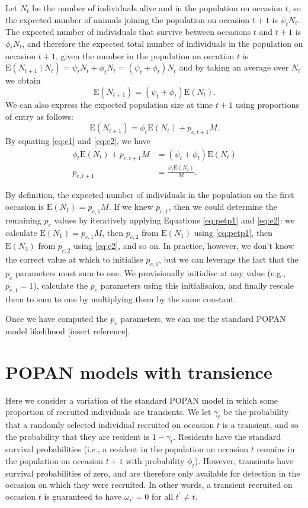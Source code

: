 \documentclass{article}
\newcommand{\E}[1]{\mathrm{E}(#1)}
\begin{document}
Let $N_t$ be the number of individuals alive and in the population on
occasion $t$, so the expected number of animals joining the population
on occasion $t + 1$ is $\psi_t N_t$. The expected number of
individuals that survive between occasions $t$ and $t + 1$ is $\phi_t
N_t$, and therefore the expected total number of individuals in the
population on occasion $t + 1$, given the number in the population on
occation $t$ is $\E{N_{t + 1} \mid N_t} = \psi_t N_t + \phi_t N_t =
(\psi_t + \phi_t)N_t$ and by taking an average over $N_t$ we obtain
\begin{equation}
  \E{N_{t + 1}} = (\psi_t + \phi_t) \E{N_t}. \label{eq:e1}
\end{equation}
We can also express the expected population size at time $t + 1$ using
proportions of entry as follows:
\begin{equation}
  \E{N_{t + 1}} = \phi_t \E{N_t} + p_{e, t + 1} M. \label{eq:e2}
\end{equation}
By equating \eqref{eq:e1} and \eqref{eq:e2}, we have
\begin{align}
  \phi_t \E{N_t} + p_{e, t + 1} M &= (\psi_t + \phi_t) \E{N_t} \nonumber \\
  p_{e, t + 1} &= \frac{\psi_t \E{N_t}}{M}. \label{eq:petp1}
\end{align}

By definition, the expected number of individuals in the population on
the first occasion is $\E{N_1} = p_{e, 1} M$. If we knew $p_{e, 1}$,
then we could determine the remaining $p_e$ values by iteratively
applying Equations \eqref{eq:petp1} and \eqref{eq:e2}: we calculate
$\E{N_1} = p_{e, 1} M$, then $p_{e, 2}$ from $\E{N_1}$ using
\eqref{eq:petp1}, then $\E{N_2}$ from $p_{e, 2}$ using \eqref{eq:e2},
and so on. In practice, however, we don't know the correct value at
which to initialise $p_{e, 1}$, but we can leverage the fact that the
$p_e$ parameters must sum to one. We provisionally initialise at any
value (e.g., $p_{e, 1} = 1$), calculate the $p_e$ parameters using
this initialisaion, and finally rescale them to sum to one by
multiplying them by the same constant.

Once we have computed the $p_e$ parameters, we can use the standard
POPAN model likelihood [insert reference].

\section{POPAN models with transience}

Here we consider a variation of the standard POPAN model in which some
proportion of recruited individuals are transients. We let $\gamma_t$
be the probability that a randomly selected individual recruited on
occasion $t$ is a transient, and so the probability that they are
resident is $1 - \gamma_t$. Residents have the standard survival
probabilities (i.e., a resident in the population on occasion $t$
remains in the population on occasion $t + 1$ with probability
$\phi_t$). However, transients have survival probabilities of zero,
and are therefore only available for detection in the occasion on
which they were recruited. In other words, a transient recruited on
occasion $t$ is guaranteed to have $\omega_{t^{\prime}} = 0$ for all
$t^\prime \ne t$.
\end{document}
